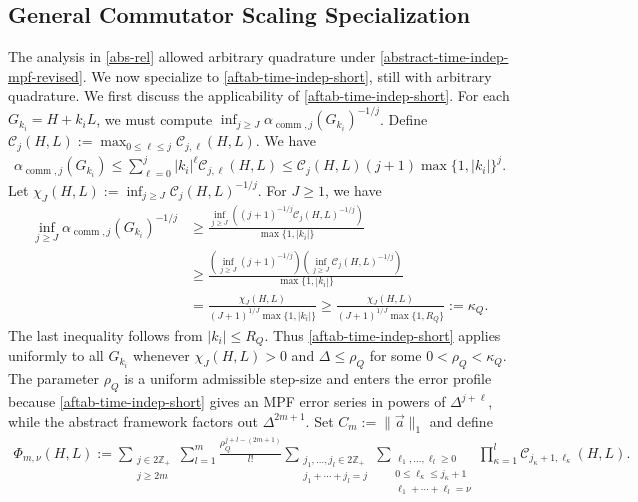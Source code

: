 \documentclass[10pt,reqno]{article}
\numberwithin{equation}{section}
\theoremstyle{plain}
\theoremstyle{definition}
\begin{document}
\subsection{General Commutator Scaling Specialization}\label{spec-aftab} 
The analysis in \cref{abs-rel} allowed arbitrary quadrature under \cref{abstract-time-indep-mpf-revised}. We now specialize to \cref{aftab-time-indep-short}, still with arbitrary quadrature. We first discuss the applicability of \cref{aftab-time-indep-short}. For each \(G_{k_i}=H+k_iL\), we must compute \(\inf_{j\geq J}\alpha_{\operatorname{comm},j}(G_{k_i})^{-1/j}\). Define \(\mathcal C_j(H,L):=\max_{0\leq \ell\leq j}\mathcal C_{j,\ell}(H,L)\). We have
\begin{align}
\label{series-alpha-comm-bound}
\alpha_{\operatorname{comm},j}(G_{k_i}) \leq \sum_{\ell=0}^{j}|k_i|^\ell\mathcal C_{j,\ell}(H,L) \leq \mathcal C_j(H,L)(j+1)\max\{1,|k_i|\}^j .
\end{align}
Let $\chi_J(H,L):=\inf_{j\geq J}\mathcal C_j(H,L)^{-1/j}$. For \(J\geq 1\), we have
\begin{align}
\label{eq:comm-bound-root}
\inf_{j\geq J}\alpha_{\operatorname{comm},j}(G_{k_i})^{-1/j} &\geq \frac{\inf_{j\geq J} ( (j+1)^{-1/j} \mathcal C_j(H,L)^{-1/j})} {\max\{1,|k_i|\}}  \\ &\geq \frac{ (\inf_{j\geq J}(j+1)^{-1/j}) (\inf_{j\geq J}\mathcal C_j(H,L)^{-1/j})} {\max\{1,|k_i|\}} \\ &= \frac{\chi_J(H,L)} {(J+1)^{1/J}\max\{1,|k_i|\}} \geq \frac{\chi_J(H,L)} {(J+1)^{1/J}\max\{1,R_Q\}} := \kappa_Q.
\end{align}
The last inequality follows from \(|k_i|\leq R_Q\). 
Thus \cref{aftab-time-indep-short} applies uniformly to all \(G_{k_i}\) whenever \(\chi_J(H,L)>0\) and \(\Delta\leq\rho_Q\) for some \(0<\rho_Q<\kappa_Q\). The parameter \(\rho_Q\) is a uniform admissible step-size and enters the error profile because \cref{aftab-time-indep-short} gives an MPF error series in powers of \(\Delta^{j+\ell}\), while the abstract framework factors out \(\Delta^{2m+1}\). Set \(C_m:=\|\vec a\|_1\) and define
\begin{align}
\label{series-Dmnu-def}
\Phi_{m,\nu}(H,L) := \sum_{\substack{j\in 2\mathbb Z_+\\ j\geq 2m}} \sum_{l=1}^{m} \frac{\rho_Q^{j+l-(2m+1)}}{l!} \sum_{\substack{j_1,\dots,j_l\in 2\mathbb Z_+\\ j_1+\cdots+j_l=j}} \sum_{\substack{\ell_1,\dots,\ell_l\geq 0\\ 0\leq \ell_\kappa\leq j_\kappa+1\\ \ell_1+\cdots+\ell_l=\nu}} \prod_{\kappa=1}^{l} \mathcal C_{j_\kappa+1,\ell_\kappa}(H,L).
\end{align}
\end{document}
